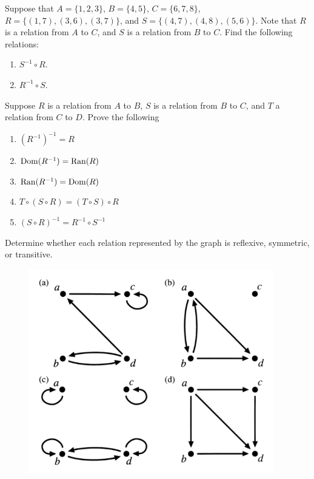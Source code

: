 \documentclass[12pt]{amsart}
\begin{document}
\begin{problem}
    Suppose that $A = \{1,2,3\}$, $B = \{4,5\}$, $C = \{6,7,8\}$, $R = \{(1,7), (3,6), (3,7)\}$, and $S = \{(4,7), (4,8), (5,6)\}$. Note that $R$ is a relation from $A$ to $C$, and $S$ is a relation from $B$ to $C$. Find the following relations:

    \begin{enumerate}
        \item  $S^{-1} \circ R$.
        \item $R^{-1} \circ S$.
    \end{enumerate}

\end{problem}

\begin{problem}
    Suppose $R$ is a relation from $A$ to $B$, $S$ is a relation from $B$ to $C$, and $T$ a relation from $C$ to $D$.
    Prove the following
    \begin{enumerate}
        \item $(R^{-1})^{-1} = R$
        \item $\operatorname{Dom}(R^{-1}) = \operatorname{Ran}(R)$
        \item $\operatorname{Ran}(R^{-1}) = \operatorname{Dom}(R)$
        \item $T\circ (S\circ R) = (T\circ S) \circ R$
        \item $(S\circ R)^{-1} = R^{-1}\circ S^{-1}$
    \end{enumerate}
\end{problem}

\begin{problem}
    Determine whether each relation represented by the graph is reflexive, symmetric, or transitive.
    \begin{figure}[ht]
        \begin{center}
            \includegraphics[width=0.95\textwidth]{graph}
        \end{center}
    \end{figure}
    
\end{problem}
\end{document}
